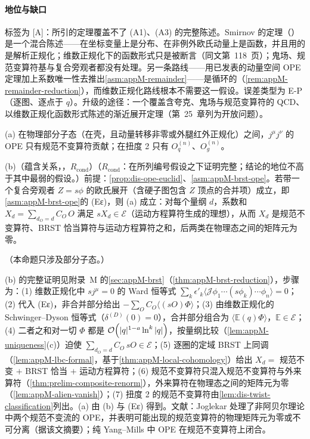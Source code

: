 \paragraph{地位与缺口}
标签为 [A]：所引的定理覆盖不了 (A1)、(A3) 的完整陈述。Smirnov 的定理（\cite[第~117~页]{Smirnov:1990rz}）是一个混合陈述——在坐标变量上是分布、在非例外欧氏动量上是函数，并且用的是解析正规化；维数正规化下的函数形式只是被断言（同文第~118~页）；鬼场、规范变算符基与复合旁观者都没有处理。另一条路线——用已发表的动量空间 OPE 定理加上系数唯一性去推出\cref{asm:appM-remainder}——是循环的（\cref{rem:appM-remainder-reduction}），而维数正规化路线根本不需要这一假设。误差类型为 E-P（逐图、逐点于 $q$）。升级的途径：一个覆盖含夸克、鬼场与规范变算符的 QCD、以维数正规化函数形式陈述的渐近展开定理（第~25~章列为开放问题）。

\begin{proposition}\label{prop:dis-ope-gi}
(a) 在物理部分子态（在壳，且动量转移非零或外腿红外正规化）之间，$j^\mu j^\nu$ 的 OPE 只有规范不变算符贡献；在扭度 2 只有 $O^{(n)}_q$、$O^{(n)}_g$。
\par
(b)（蕴含关系，\tagR，$R_{\mathrm{cond}}$）（$R_{\mathrm{cond}}$：在所列编号假设之下证明完整；结论的地位不高于其中最弱的假设。）前提：\cref{prop:dis-ope-euclid}、\cref{asm:appM-brst-ope}。若带一个复合旁观者 $Z=s\phi$ 的欧氏展开（含硬子图包含 $Z$ 顶点的合并项）成立，即\cref{asm:appM-brst-ope}的 (Eε)，则 (a) 成立：对每个量纲 $d$，系数和 $X_d=\sum_{d_O=d}C_O\,O$ 满足 $sX_d\in\mathcal E$（运动方程算符生成的理想），从而 $X_d$ 是规范不变算符、BRST 恰当算符与运动方程算符之和，后两类在物理态之间的矩阵元为零。
\par
（本命题只涉及部分子态。）
\end{proposition}

\begin{proofsketch}
(b) 的完整证明见附录~M 的\cref{sec:appM-brst}（\cref{thm:appM-brst-reduction}），步骤为：(1) 维数正规化中 $sj^\mu=0$ 的 Ward 恒等式 $\sum_k\epsilon'_k\langle\mathcal J\phi_1\cdots(s\phi_k)\cdots\phi_n\rangle=0$；(2) 代入 (Eε)，非合并部分给出 $-\sum_OC_O\langle(sO)\Phi\rangle$；(3) 由维数正规化的 Schwinger--Dyson 恒等式（$\delta^{(D)}(0)=0$），合并部分组合为 $\langle\mathbb E(q)\Phi\rangle$，$\mathbb E\in\mathcal E$；(4) 二者之和对一切 $\Phi$ 都是 $\mathcal{O}\!\left(|q|^{1-a}\ln^k|q|\right)$，按量纲比较（\cref{lem:appM-uniqueness}(c)）迫使 $\sum_{d_O=d}C_O\,sO\in\mathcal E$；(5) 逐圈的定域 BRST 上同调（\cref{lem:appM-lbc-formal}，基于\cref{thm:appM-local-cohomology}）给出 $X_d=$ 规范不变 $+$ BRST 恰当 $+$ 运动方程算符；(6) 规范不变算符只混入规范不变算符与外来算符（\cref{thm:prelim-composite-renorm}），外来算符在物理态之间的矩阵元为零（\cref{lem:appM-alien-vanish}）；(7) 扭度 2 的规范不变算符由\cref{lem:dis-twist-classification}列出。(a) 由 (b) 与 (Eε) 得到。文献：Joglekar 处理了非阿贝尔理论中两个规范不变流的 OPE，并表明可能出现的规范变算符的物理矩阵元为零或不可分离（据该文摘要）\cite{Joglekar:1976eb,Joglekar:1976pe}；纯 Yang--Mills 中 OPE 在规范不变算符上闭合\cite{Hollands:2007zg}。
\end{proofsketch}


